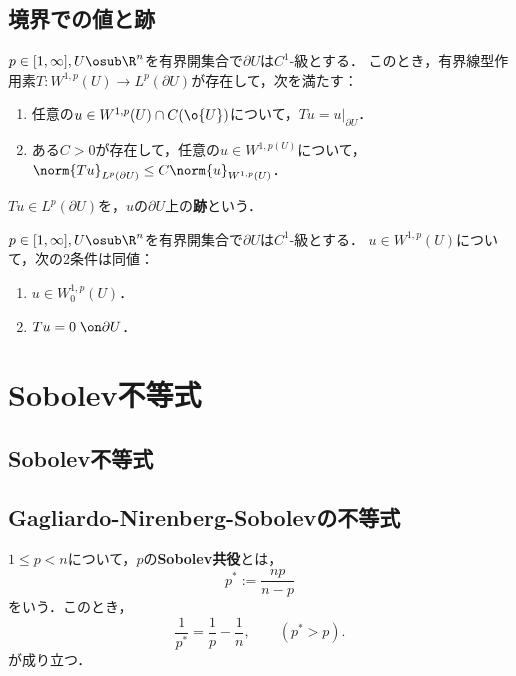 \documentclass[uplatex,dvipdfmx]{jsreport}
\begin{document}
\subsection{境界での値と跡}

\begin{theorem}
    $p\in[1,\infty],U\osub\R^n$を有界開集合で$\partial U$は$C^1$-級とする．
    このとき，有界線型作用素$T:W^{1,p}(U)\to L^p(\partial U)$が存在して，次を満たす：
    \begin{enumerate}
        \item 任意の$u\in W^{1,p}(U)\cap C(\o{U})$について，$Tu=u|_{\partial U}$．
        \item ある$C>0$が存在して，任意の$u\in W^{1,p(U)}$について，$\norm{Tu}_{L^p(\partial U)}\le C\norm{u}_{W^{1,p}(U)}$．
    \end{enumerate}
    $Tu\in L^p(\partial U)$を，$u$の$\partial U$上の\textbf{跡}という．
\end{theorem}

\begin{theorem}\label{thm-trace-zero-function-in-W1p}
    $p\in[1,\infty],U\osub\R^n$を有界開集合で$\partial U$は$C^1$-級とする．
    $u\in W^{1,p}(U)$について，次の2条件は同値：
    \begin{enumerate}
        \item $u\in W_0^{1,p}(U)$．
        \item $Tu=0\;\on\partial U$．
    \end{enumerate}
\end{theorem}

\section{Sobolev不等式}

\subsection{Sobolev不等式}

\subsection{Gagliardo-Nirenberg-Sobolevの不等式}

\begin{definition}
    $1\le p<n$について，$p$の\textbf{Sobolev共役}とは，
    \[p^*:=\frac{np}{n-p}\]
    をいう．このとき，
    \[\frac{1}{p^*}=\frac{1}{p}-\frac{1}{n},\qquad(p^*>p).\]
    が成り立つ．
\end{definition}
\end{document}
